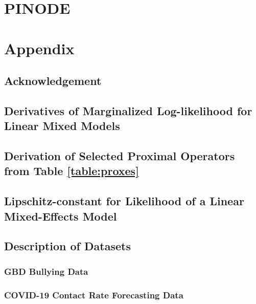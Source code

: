 \documentclass[12pt,a4paper]{book}
\numberwithin{equation}{section} %
\numberwithin{figure}{section} %
\numberwithin{table}{section} %
\begin{document}
\chapter{PINODE}







\clearpage

\appendix
\chapter{Appendix}
\section{Acknowledgement}


\section{Derivatives of Marginalized Log-likelihood for Linear Mixed Models}
\label{appendix:derivatives_of_lmm}


\section{Derivation of Selected Proximal Operators from Table \ref{table:proxes}}
\label{appendix:proxes}


\section{Lipschitz-constant for Likelihood of a Linear Mixed-Effects Model}
\label{appendix:lipschitz_constant}


\section{Description of Datasets}
\subsection{GBD Bullying Data}


\subsection{COVID-19 Contact Rate Forecasting Data}


\end{document}
